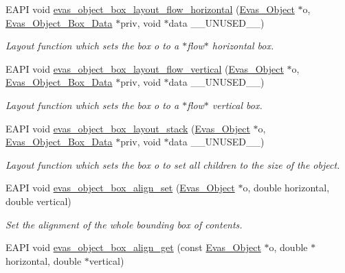 \begin{DoxyCompactItemize}
EAPI void \hyperlink{group__Evas__Object__Box_ga99ee061972f53fb7d9213d586c29cc8d}{evas\_\-object\_\-box\_\-layout\_\-flow\_\-horizontal} (\hyperlink{group__Evas__Object__Group_ga9e19e6dd1f517a0ba437c0114d3e7c97}{Evas\_\-Object} $\ast$o, \hyperlink{struct__Evas__Object__Box__Data}{Evas\_\-Object\_\-Box\_\-Data} $\ast$priv, void $\ast$data \_\-\_\-UNUSED\_\-\_\-)
\begin{DoxyCompactList}\small\item\em Layout function which sets the box {\itshape o\/} to a $\ast$flow$\ast$ horizontal box. \item\end{DoxyCompactList}\item 
EAPI void \hyperlink{group__Evas__Object__Box_gaa6e0bf47f84d7bb1b2439f4b6123e7d7}{evas\_\-object\_\-box\_\-layout\_\-flow\_\-vertical} (\hyperlink{group__Evas__Object__Group_ga9e19e6dd1f517a0ba437c0114d3e7c97}{Evas\_\-Object} $\ast$o, \hyperlink{struct__Evas__Object__Box__Data}{Evas\_\-Object\_\-Box\_\-Data} $\ast$priv, void $\ast$data \_\-\_\-UNUSED\_\-\_\-)
\begin{DoxyCompactList}\small\item\em Layout function which sets the box {\itshape o\/} to a $\ast$flow$\ast$ vertical box. \item\end{DoxyCompactList}\item 
EAPI void \hyperlink{group__Evas__Object__Box_gae40153d3702dcb79f2587364cde2fb7b}{evas\_\-object\_\-box\_\-layout\_\-stack} (\hyperlink{group__Evas__Object__Group_ga9e19e6dd1f517a0ba437c0114d3e7c97}{Evas\_\-Object} $\ast$o, \hyperlink{struct__Evas__Object__Box__Data}{Evas\_\-Object\_\-Box\_\-Data} $\ast$priv, void $\ast$data \_\-\_\-UNUSED\_\-\_\-)
\begin{DoxyCompactList}\small\item\em Layout function which sets the box {\itshape o\/} to set all children to the size of the object. \item\end{DoxyCompactList}\item 
EAPI void \hyperlink{group__Evas__Object__Box_gae66fe763591e62621cf6352528d97e10}{evas\_\-object\_\-box\_\-align\_\-set} (\hyperlink{group__Evas__Object__Group_ga9e19e6dd1f517a0ba437c0114d3e7c97}{Evas\_\-Object} $\ast$o, double horizontal, double vertical)\label{group__Evas__Object__Box_gae66fe763591e62621cf6352528d97e10}

\begin{DoxyCompactList}\small\item\em Set the alignment of the whole bounding box of contents. \item\end{DoxyCompactList}\item 
EAPI void \hyperlink{group__Evas__Object__Box_gad87e3a868b14d1a28da7511f95b59673}{evas\_\-object\_\-box\_\-align\_\-get} (const \hyperlink{group__Evas__Object__Group_ga9e19e6dd1f517a0ba437c0114d3e7c97}{Evas\_\-Object} $\ast$o, double $\ast$horizontal, double $\ast$vertical)\label{group__Evas__Object__Box_gad87e3a868b14d1a28da7511f95b59673}


\end{DoxyCompactItemize}
